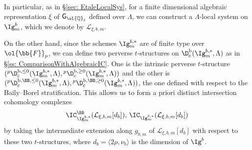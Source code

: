 \documentclass[letterpaper,11pt]{amsart}
\begin{document}
In particular, as in \S \ref{sec: EtaleLocalSys}, for a finite dimensional algebraic representation $\xi$ of $\mathsf{G}_{\ol{\mathbb{Q}}_{\ell}}$ defined over $\Lambda$, we can construct a $\Lambda$-local system on $\Ig^{b}_{m}$, which we denote by $\mathcal{L}_{\xi,b,m}$. 

On the other hand, since the schemes $\Ig^{b,*}_{m}$ are of finite type over $\ol{\bb{F}}_{p}$, we can define two perverse $t$-structures
on $\D^{\mathrm{b}}_{\mathrm{c}}(\Ig^{b,\ast}_m,\Lambda)$ as in \S \ref{ss: ComparisonWithAlgebraicIC}. One is the intrinsic perverse $t$-structure $(\phantom{}^{p}\D_{\mathrm{c}}^{\mathrm{b},\leq 0}(\Ig^{b,\ast}_m,\Lambda),\phantom{}^{p}\D_{\mathrm{c}}^{\mathrm{b},\geq 0}(\Ig^{b,\ast}_{m},\Lambda))$ and the other is $(\phantom{}^{p}\D_{\mathrm{c}}^{\mathrm{b},\BB,\leq 0}(\Ig^{b,\ast}_m,\Lambda),\phantom{}^{p}\D_{\mathrm{c}}^{\mathrm{b},\BB,\geq 0}(\Ig^{b,\ast}_{m},\Lambda))$, the one defined with respect to the Baily--Borel stratification. This allows us to form a priori distinct intersection cohomology complexes
\[ \IC_{\Ig^{b,*}_{m}}^{\BB}(\mathcal{L}_{\xi,b,m}[d_{b}]),\, \IC_{\Ig^{b,*}_{m}}(\mathcal{L}_{\xi,b,m}[d_{b}]) \]
by taking the intermediate extension along $g_{b,m}$ of $\mathcal{L}_{\xi,b,m}[d_{b}]$ with respect to these two $t$-structures, where $d_b=\langle2\rho,\nu_b\rangle$ is the dimension of $\Ig^b$. 
\end{document}
